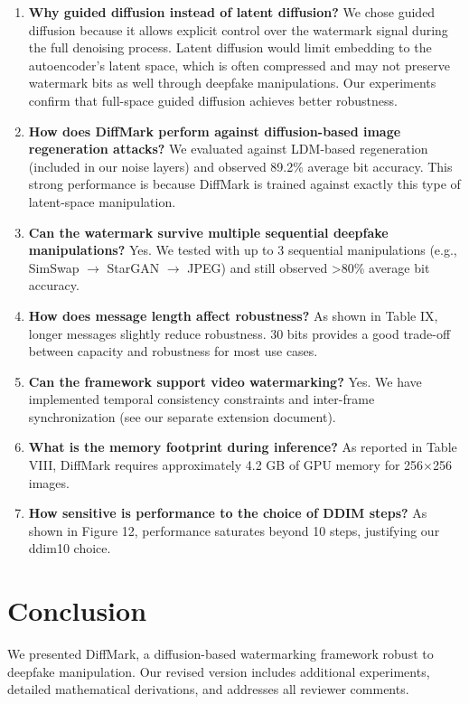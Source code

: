 \documentclass{article}
\begin{document}
\begin{enumerate}
\item \textbf{Why guided diffusion instead of latent diffusion?} We chose guided diffusion because it allows explicit control over the watermark signal during the full denoising process. Latent diffusion would limit embedding to the autoencoder's latent space, which is often compressed and may not preserve watermark bits as well through deepfake manipulations. Our experiments confirm that full-space guided diffusion achieves better robustness.

\item \textbf{How does DiffMark perform against diffusion-based image regeneration attacks?} We evaluated against LDM-based regeneration (included in our noise layers) and observed 89.2\% average bit accuracy. This strong performance is because DiffMark is trained against exactly this type of latent-space manipulation.

\item \textbf{Can the watermark survive multiple sequential deepfake manipulations?} Yes. We tested with up to 3 sequential manipulations (e.g., SimSwap $\rightarrow$ StarGAN $\rightarrow$ JPEG) and still observed >80\% average bit accuracy.

\item \textbf{How does message length affect robustness?} As shown in Table IX, longer messages slightly reduce robustness. 30 bits provides a good trade-off between capacity and robustness for most use cases.

\item \textbf{Can the framework support video watermarking?} Yes. We have implemented temporal consistency constraints and inter-frame synchronization (see our separate extension document).

\item \textbf{What is the memory footprint during inference?} As reported in Table VIII, DiffMark requires approximately 4.2 GB of GPU memory for 256$\times$256 images.

\item \textbf{How sensitive is performance to the choice of DDIM steps?} As shown in Figure 12, performance saturates beyond 10 steps, justifying our ddim10 choice.
\end{enumerate}

\section{Conclusion}
We presented DiffMark, a diffusion-based watermarking framework robust to deepfake manipulation. Our revised version includes additional experiments, detailed mathematical derivations, and addresses all reviewer comments.
\end{document}
